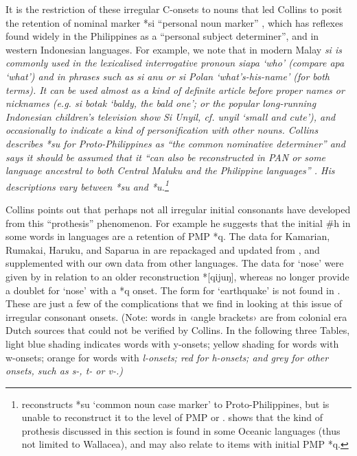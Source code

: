 It is the restriction of these irregular C-onsets to nouns that
led Collins to posit the retention of  nominal marker
*si “personal noun marker” \citep[124]{Collins1983},
which has reflexes found widely in the Philippines as a “personal
subject determiner”, and in western Indonesian languages.
For example, we note that in modern Malay \it{si} is commonly
used in the lexicalised interrogative pronoun \it{siapa} ‘who’
(compare \it{apa} ‘what’) and in phrases such as \it{si anu}
or \it{si Polan} ‘what’s-his-name’ (for both terms).
It can be used almost as a kind of definite article before proper
names or nicknames (e.g.
\it{si botak} ‘baldy, the bald one’; or the popular long-running
Indonesian children’s television show \it{Si Unyil}, cf.
\it{unyil} ‘small and cute’), and occasionally to indicate a
kind of personification with other nouns.
Collins describes *su for Proto-Philippines as “the common nominative
determiner” and says it should be assumed that it “can also be reconstructed
in PAN or some language ancestral to both Central Maluku
and the Philippine languages” \citep[126]{Collins1983}.
His descriptions vary between *su
and *u.\footnote{
		\citet{Blust2015} reconstructs *su ‘common noun
		case marker’ to Proto-Philippines,
		but is unable to reconstruct it to the level of PMP or .
		\citet{Lichtenberk1988} shows that the kind of prothesis discussed
		in this section is found in some Oceanic languages (thus not
		limited to Wallacea), and may also relate to items with initial PMP *q.}

Collins points out that perhaps not all irregular initial consonants
have developed from this “prothesis” phenomenon.
For example he suggests that the initial {\#}h in some words
in  languages are a retention of PMP *q.
The data for Kamarian,
Rumakai, Haruku, and Saparua in  are repackaged
and updated from \citet[121]{Collins1983},
and supplemented with our own data from other languages.
The data for ‘nose’ were given by \citet[121]{Collins1983} in
relation to an older reconstruction *[qijuŋ],
whereas \citet{BlustTrussel2020} no longer provide a doublet
for ‘nose’ with a *q onset.
The form for ‘earthquake’ is not found in \citet{BlustTrussel2020}.
These are just a few of the complications that we find in looking
at this issue of irregular consonant onsets.
(Note: words in ‹angle brackets› are from colonial era Dutch
sources that could not be verified by Collins.
In the following three Tables,
light blue shading indicates words with y-onsets; yellow shading
for words with w-onsets; orange for words with \it{l}-onsets;
red for \it{h}-onsets; and grey for other onsets,
such as \it{s-, t-} or \it{v-}.)

